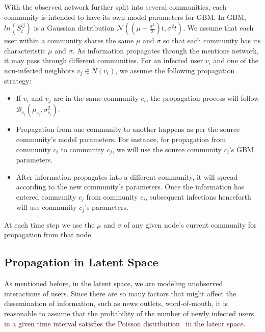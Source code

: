 With the observed network further split into several communities, each community is intended to have its own model parameters for GBM. In GBM, $ln(S_t^{ij})$
is a Gaussian distribution $\mathcal{N}((\mu - \frac{\sigma^2}{2})t, \sigma ^{2}t)$. We assume that each user within a community shares the same $\mu$ and $\sigma$ so that each community has its characteristic $\mu$ and $\sigma$. As information propagates through the mentions network, it may pass through different communities.
For an infected user $v_i$ and one of the non-infected
neighbors $v_j \in N(v_i)$, we assume the following propagation
strategy:
\begin{itemize}
    \item If $v_i$ and $v_j$ are in the same community $c_i$, the propagation process will follow $\mathcal{B}_{c_i}(\mu_{c_i}, \sigma_{c_i}^2)$.
    \item Propagation from one community to another happens as per the source community's model parameters. For instance, for propagation from community ${c_i}$ to community ${c_j}$, we will use the source community ${c_i}$'s GBM parameters.
    \item After information propagates into a different community, it will spread according to the new community's parameters. Once the information has entered community ${c_j}$ from community ${c_i}$, subsequent infections henceforth
will use community ${c_j}$'s parameters.
\end{itemize}

\noindent
At each time step we use the $\mu$ and $\sigma$ of any given node's current community for propagation from that node.
\subsection{Propagation in Latent Space}
As mentioned before, in the latent space, we are modeling unobserved interactions of users. Since there are so many factors that might affect the dissemination of information, such as news outlets, word-of-mouth, it is reasonable to assume that the probability of the number of newly infected users in a given time interval satisfies the Poisson distribution~\cite{haight1967handbook} in the latent space.


